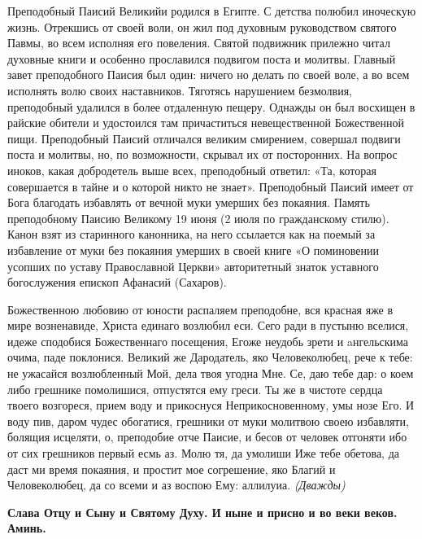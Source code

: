 




Преподобный Паисий Великийи родился в Египте. С детства полюбил иноческую жизнь. Отрекшись от своей воли, он жил под духовным руководством святого Павмы, во всем исполняя его повеления. Святой подвижник прилежно читал духовные книги и особенно прославился подвигом поста и молитвы. Главный завет преподобного Паисия был один:
ничего но делать по своей воле, а во всем исполнять волю своих наставников. Тяготясь нарушением безмолвия, преподобный удалился в более отдаленную пещеру. Однажды он был восхищен в райские обители и удостоился там причаститься невещественной Божественной пищи. Преподобный Паисий отличался великим смирением, совершал подвиги поста и молитвы, но, по возможности, скрывал их от посторонних. На вопрос иноков, какая добродетель выше всех, преподобный ответил: «Та, которая совершается в тайне и о которой никто не знает». Преподобный Паисий
имеет от Бога благодать избавлять от вечной муки умерших без покаяния. Память преподобному Паисию Великому 19 июня (2 июля по гражданскому стилю). Канон взят из старинного канонника, на него ссылается как на поемый за избавление от муки без покаяния умерших в своей книге «О поминовении усопших по уставу Православной Церкви» авторитетный знаток уставного богослужения епископ Афанасий (Сахаров).





Божественною любовию от юности распаляем преподобне, вся красная яже в мире возненавиде, Христа единаго возлюбил еси. Сего ради в пустыню вселися, идеже сподобися Божественнаго посещения, Егоже неудобь зрети и
aнгельскима очима, паде поклонися. Великий же Дародатель, яко Человеколюбец, рече к тебе: не ужасайся возлюбленный Мой, дела твоя угодна Мне. Се, даю тебе дар: о коем либо грешнике помолишися, отпустятся ему греси. Ты же в чистоте сердца твоего возгореся, прием воду и прикоснуся Неприкосновенному, умы нозе Его. И воду пив, даром чудес обогатися, грешники от муки молитвою своею избавляти, болящия исцеляти, о, преподобие отче Паисие, и бесов от человек отгоняти ибо от сих грешников первый есмь аз. Молю тя, да умолиши Иже тебе обетова, да даст ми время покаяния, и простит мое согрешение, яко Благий и Человеколюбец, да со всеми и аз воспою Ему: аллилуиа. \itshape (Дважды)\normalfont{}


\bfseries Слава Отцу и Сыну и Святому Духу. И ныне и присно и во веки веков. Аминь.\normalfont{}\nopagebreak


